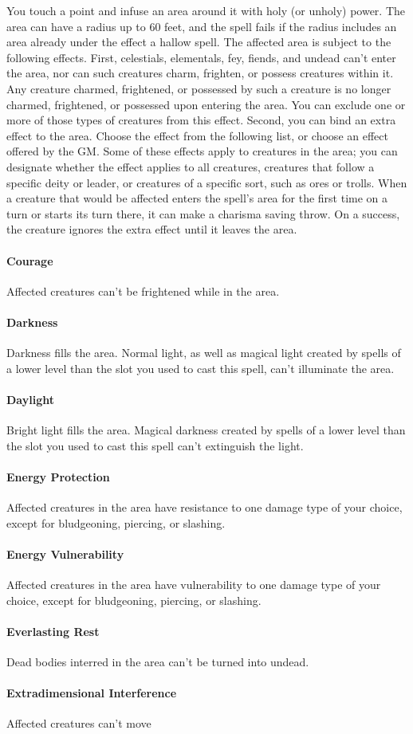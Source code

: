 \documentclass[12pt,showtrims]{memoir}
\begin{document}
\vspace{1\baselineskip}\noindent You touch a point and infuse an area around it with holy (or unholy) power. The area can have a radius up to 60 feet, and the spell fails if the radius includes an area already under the effect a hallow spell. The affected area is subject to the following effects. First, celestials, elementals, fey, fiends, and undead can't enter the area, nor can such creatures charm, frighten, or possess creatures within it. Any creature charmed, frightened, or possessed by such a creature is no longer charmed, frightened, or possessed upon entering the area. You can exclude one or more of those types of creatures from this effect. Second, you can bind an extra effect to the area. Choose the effect from the following list, or choose an effect offered by the GM. Some of these effects apply to creatures in the area; you can designate whether the effect applies to all creatures, creatures that follow a specific deity or leader, or creatures of a specific sort, such as ores or trolls. When a creature that would be affected enters the spell's area for the first time on a turn or starts its turn there, it can make a charisma saving throw. On a success, the creature ignores the extra effect until it leaves the area. \paragraph{Courage} Affected creatures can't be frightened while in the area. \paragraph{Darkness} Darkness fills the area. Normal light, as well as magical light created by spells of a lower level than the slot you used to cast this spell, can't illuminate the area. \paragraph{Daylight} Bright light fills the area. Magical darkness created by spells of a lower level than the slot you used to cast this spell can't extinguish the light. \paragraph{Energy Protection} Affected creatures in the area have resistance to one damage type of your choice, except for bludgeoning, piercing, or slashing. \paragraph{Energy Vulnerability} Affected creatures in the area have vulnerability to one damage type of your choice, except for bludgeoning, piercing, or slashing. \paragraph{Everlasting Rest} Dead bodies interred in the area can't be turned into undead. \paragraph{Extradimensional Interference} Affected creatures can't move 
\end{document}
